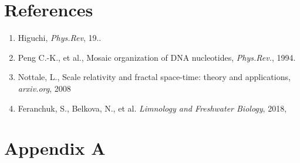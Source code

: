 \documentclass[a4paper]{article}
\begin{document}

\newpage




\vskip 12pt


\section*{References}

\begin{enumerate}

\item Higuchi, \textit{Phys.Rev}, 19..

\item Peng C.-K., et al., Mosaic organization of DNA nucleotides, \textit{Phys.Rev.}, 1994.

\item Nottale, L., Scale relativity and fractal space-time: theory and applications, \textit{arxiv.org}, 2008

\item Feranchuk, S., Belkova, N., et al. \textit{Limnology and Freshwater Biology}, 2018,

\end{enumerate}

\newpage

\section*{Appendix A}
\end{document}
